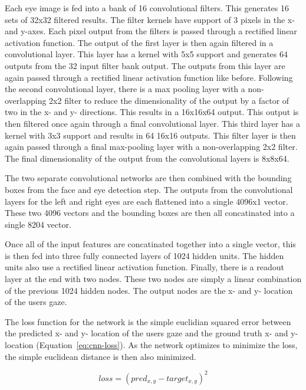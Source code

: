 \documentclass[10pt,twocolumn,letterpaper]{article}
\begin{document}
Each eye image is fed into a bank of 16 convolutional filters. This
generates 16 sets of 32x32 filtered results. The filter kernels have
support of 3 pixels in the x- and y-axes. Each pixel output from the
filters is passed through a rectified linear activation function. The
output of the first layer is then again filtered in a convolutional
layer. This layer has a kernel with 5x5 support and generates 64
outputs from the 32 input filter bank output. The outputs from this
layer are again passed through a rectified linear activation function
like before. Following the second convolutional layer, there is a max
pooling layer with a non-overlapping 2x2 filter to reduce the
dimensionality of the output by a factor of two in the x- and y-
directions. This results in a 16x16x64 output. This output is then
filtered once again through a final convolutional layer. This third
layer has a kernel with 3x3 support and results in 64 16x16
outputs. This filter layer is then again passed through a final
max-pooling layer with a non-overlapping 2x2 filter. The final
dimensionality of the output from the convolutional layers is 8x8x64.

The two separate convolutional networks are then combined with the
bounding boxes from the face and eye detection step. The outputs
from the convolutional layers for the left and right eyes are each
flattened into a single 4096x1 vector. These two 4096 vectors and the
bounding boxes are then all concatinated into a single 8204 vector.

Once all of the input features are concatinated together into a single
vector, this is then fed into three fully connected layers of 1024
hidden units. The hidden units also use a rectified linear activation
function. Finally, there is a readout layer at the end with two
nodes. These two nodes are simply a linear combination of the previous
1024 hidden nodes. The output nodes are the x- and y- location of the
users gaze.

The loss function for the network is the simple euclidian squared
error between the predicted x- and y- location of the users gaze and
the ground truth x- and y- location (Equation~\ref{eq:cnn-loss}). As
the network optimizes to minimize the loss, the simple euclidean
distance is then also minimized.

\begin{equation}
  loss = (pred_{x,y} - target_{x,y})^2
  \label{eq:cnn-loss}
\end{equation}
\end{document}
